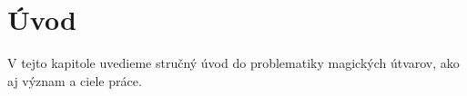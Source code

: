 \chapter*{Úvod} %

V tejto kapitole uvedieme stručný úvod do problematiky magických útvarov, ako aj význam a ciele práce.
